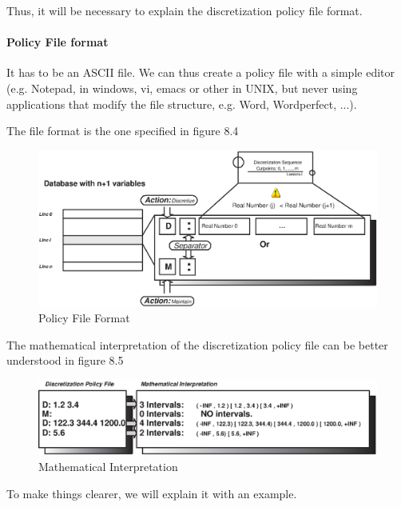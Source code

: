 Thus, it will be necessary to explain the discretization policy file format.

\paragraph{Policy File format}
It has to be an ASCII file. We can thus create a policy file with a simple editor (e.g. Notepad,
in windows, vi, emacs or other in UNIX, but never using applications that modify the
file structure, e.g. Word, Wordperfect, ...).

The file format is the one specified in figure 8.4

\begin{figure}
\label{cap08:04}
\begin{center}
\includegraphics[width=130mm]{Learning/Preprocessing/fig/figure-8.04.eps} 
\end{center}
\caption{Policy File Format}
\end{figure}

The mathematical interpretation of the discretization policy file can be better understood in figure 8.5

\begin{figure}
\begin{center}
\includegraphics[width=130mm]{Learning/Preprocessing/fig/figure-8.05.eps} 
\end{center}
\label{cap08:05}
\caption{Mathematical Interpretation}
\end{figure}


To make things clearer, we will explain it with an example.

